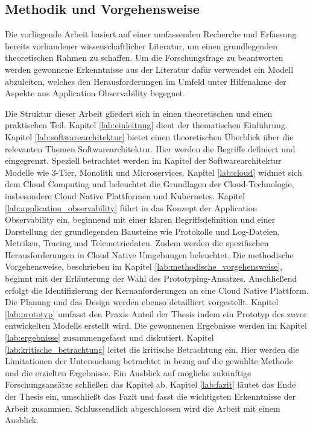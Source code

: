 \subsection{Methodik und Vorgehensweise}\label{lab:methodik}

Die vorliegende Arbeit basiert auf einer umfassenden Recherche und Erfassung bereits vorhandener wissenschaftlicher Literatur, um einen grundlegenden theoretischen Rahmen zu schaffen. Um die Forschungsfrage zu beantworten werden gewonnene Erkenntnisse aus der Literatur dafür verwendet ein Modell abzuleiten, welches den Herausforderungen im \cn Umfeld unter Hilfenahme der Aspekte aus Application Observability begegnet.


Die Struktur dieser Arbeit gliedert sich in einen theoretischen und einen praktischen Teil. Kapitel \ref{lab:einleitung} dient der thematischen Einführung. Kapitel \ref{lab:softwarearchitektur} bietet einen theoretischen Überblick über die relevanten Themen Softwarearchitektur. Hier werden die Begriffe definiert und eingegrenzt. Speziell betrachtet werden im Kapitel der Softwarearchitektur Modelle wie 3-Tier, Monolith und Microservices. Kapitel \ref{lab:cloud} widmet sich dem Cloud Computing und beleuchtet die Grundlagen der Cloud-Technologie, insbesondere Cloud Native Plattformen und Kubernetes.
Kapitel \ref{lab:application_observability} führt in das Konzept der Application Observability ein, beginnend mit einer klaren Begriffsdefinition und einer Darstellung der grundlegenden Bausteine wie Protokolle und Log-Dateien, Metriken, Tracing und Telemetriedaten. Zudem werden die spezifischen Herausforderungen in Cloud Native Umgebungen beleuchtet.
Die methodische Vorgehensweise, beschrieben im Kapitel \ref{lab:methodische_vorgehensweise}, beginnt mit der Erläuterung der Wahl des Prototyping-Ansatzes. Anschließend erfolgt die Identifizierung der Kernanforderungen an eine Cloud Native Plattform. Die Planung und das Design werden ebenso detailliert vorgestellt.
Kapitel \ref{lab:prototyp} umfasst den Praxis Anteil der Thesis indem ein Prototyp des zuvor entwickelten Modells erstellt wird. Die gewonnenen Ergebnisse werden im Kapitel \ref{lab:ergebnisse} zusammengefasst und diskutiert. Kapitel \ref{lab:kritische_betrachtung} leitet die kritische Betrachtung ein. Hier werden die Limitationen der Untersuchung betrachtet in bezug auf die gewählte Methode und die erzielten Ergebnisse. Ein Ausblick auf mögliche zukünftige Forschungsansätze schließen das Kapitel ab. Kapitel \ref{lab:fazit} läutet das Ende der Thesis ein, umschließt das Fazit und fasst die wichtigsten Erkenntnisse der Arbeit zusammen. Schlussendlich abgeschlossen wird die Arbeit mit einem Ausblick.

